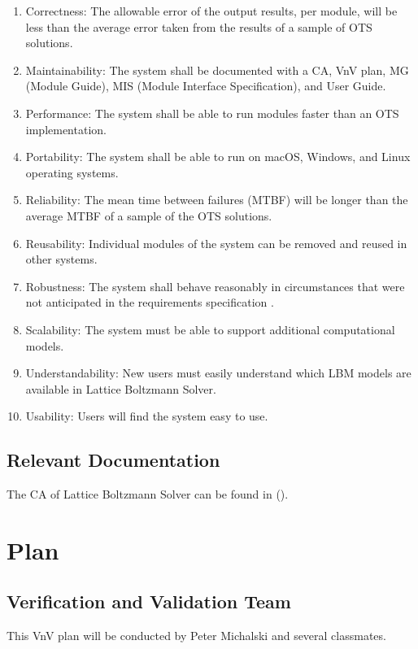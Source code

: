 \documentclass[12pt, titlepage]{article}
\newcommand{\myprogname}{Lattice Boltzmann Solver}
\begin{document}
\begin{enumerate}
\item Correctness: The allowable error of the output results, per module, will be less than the average error taken from the results of a sample of OTS solutions.
\item Maintainability: The system shall be documented with a CA, VnV plan, MG (Module Guide), MIS (Module Interface Specification), and User Guide.
\item Performance: The system shall be able to run modules faster than an OTS implementation.
\item Portability: The system shall be able to run on macOS, Windows, and Linux operating systems.
\item Reliability: The mean time between failures (MTBF) will be longer than the average MTBF of a sample of the OTS solutions.
\item Reusability: Individual modules of the system can be removed and reused in other systems.
\item Robustness: The system shall behave reasonably in circumstances that were not anticipated in the requirements specification \cite{ghezzi1991fundamentals}.
\item Scalability: The system must be able to support additional computational models.
\item Understandability: New users must easily understand which LBM models are available in {\myprogname}.
\item Usability: Users will find the system easy to use.
\end{enumerate}


\subsection{Relevant Documentation}

The CA of {\myprogname} can be found in (\citet{LBM_CA_PM}).\\ 

\newpage

\section{Plan}
\label{testplan}	
\subsection{Verification and Validation Team}

This VnV plan will be conducted by Peter Michalski and several classmates.
\end{document}
